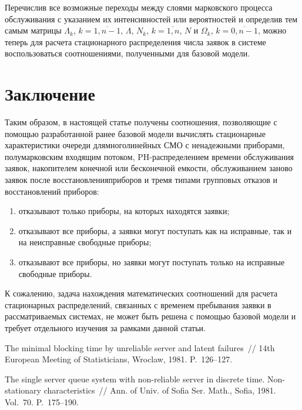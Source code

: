 \begin{multicols}{2}
Перечислив все возможные переходы между слоями марковского процесса
обслуживания с указанием их интенсивностей или вероятностей и определив
тем самым матрицы $\Lambda_k$, $k=\overline{1,n-1}$,
$\Lambda$, $N_k$, $k=\overline{1,n}$, $N$ и $\Omega_k$,
$k=\overline{0,n-1}$, можно теперь для расчета стационарного
распределения числа заявок в системе воспользоваться соотношениями,
полученными для базовой модели.

\section{Заключение}

Таким образом, в настоящей статье получены соотношения, позволяющие
с помощью разра\-ботанной ранее базовой модели вы\-чис\-лять стационарные
характеристики очереди для\linebreak многолинейных СМО с ненадежными приборами,
полумарковским
входящим потоком, PH-рас\-пре\-де\-ле\-ни\-ем времени об\-слу\-жи\-ва\-ния заявок,
накопителем конечной или бесконечной емкости, обслу\-жи\-ва\-ни\-ем заново
заявок после восстановления\linebreak приборов и тремя типами групповых
отказов и восстановлений приборов:
\begin{enumerate}[(1)]
\item отказывают только приборы, на которых находятся заявки;
\item отказывают все приборы, а заявки могут поступать как на исправные,
так и на неисправные свободные приборы;
\item
отказывают все приборы, но заявки могут поступать только на
исправные свободные приборы.
\end{enumerate}

К сожалению, задача нахождения математических соотношений для
расчета стационарных
распределений, связанных с временем пребывания заявки в рассматриваемых
системах, не может быть решена с помощью базовой модели и
требует отдельного изучения за рамками данной статьи.


{\small\frenchspacing
{\baselineskip=11.9pt
\begin{thebibliography}{99}    

The minimal blocking time by unreliable server and latent failures~//
14th European Meeting of Statisticians, Wroclaw, 1981. P.~126--127.

The single server queue system with non-reliable server in discrete time.
Non-stationary characteristics~// Ann. of Univ. of Sofia Ser. Math., Sofia, 1981. Vol.~70. P.~175--190.


\end{thebibliography}}}
\end{multicols}
